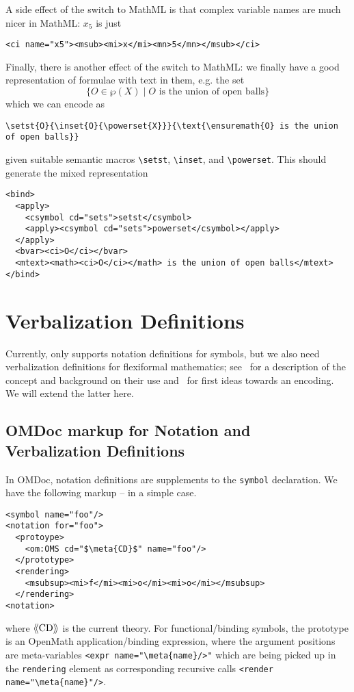 \documentclass{bluenote}
\def\omdoc{\textsf{OMDoc}\xspace}
\def\openmath{\textsf{OpenMath}\xspace}
\def\lstomdoc{\lstinline[language={[1.3]OMDoc},mathescape]}
\def\meta#1{\ensuremath{\langle\kern-.2em\langle\text{#1}\rangle\kern-.2em\rangle}}
\begin{document}
A side effect of the switch to MathML is that complex variable names are much nicer in
MathML: $x_5$ is just 
\begin{lstlisting}[language=MathML]
<ci name="x5"><msub><mi>x</mi><mn>5</mn></msub></ci>
\end{lstlisting}

Finally, there is another effect of the switch to MathML: we finally have a good
representation of formulae with text in them, e.g. the set 
\[\{O\in\wp(X)\mid O \text{ is the union of open balls}\}\]%
which we can encode as 
\begin{lstlisting}
\setst{O}{\inset{O}{\powerset{X}}}{\text{\ensuremath{O} is the union of open balls}}
\end{lstlisting}
given suitable semantic macros \lstinline|\setst|, \lstinline|\inset|, and
\lstinline|\powerset|. This should generate the mixed representation
\begin{lstlisting}[language=MathML]
<bind>
  <apply>
    <csymbol cd="sets">setst</csymbol>
    <apply><csymbol cd="sets">powerset</csymbol></apply>
  </apply>
  <bvar><ci>O</ci></bvar>
  <mtext><math><ci>O</ci></math> is the union of open balls</mtext>
</bind>
\end{lstlisting}

\section{Verbalization Definitions}

Currently, \sTeX only supports notation definitions for symbols, but we also need
verbalization definitions for flexiformal mathematics; see~\cite{Kohlhase:dmesmgm14} for a
description of the concept and background on their use and~\cite[section
5]{Kohlhase:dmsmglom14} for first ideas towards an \sTeX encoding. We will extend the
latter here.

\subsection{\omdoc markup for Notation and Verbalization Definitions}

In \omdoc, notation definitions are supplements to the \lstomdoc|symbol| declaration. We
have the following markup -- in a simple case. 

\begin{lstlisting}[language={[1.3]OMDoc},mathescape, 
  label=lst:nd-classical,caption=A classical Notation Definition]
<symbol name="foo"/>
<notation for="foo">
  <protoype>
    <om:OMS cd="$\meta{CD}$" name="foo"/>
  </prototype>
  <rendering>
    <msubsup><mi>f</mi><mi>o</mi><mi>o</mi></msubsup>
  </rendering>
<notation>
\end{lstlisting}
where \meta{CD} is the current theory. For functional/binding symbols, the prototype is an
\openmath application/binding expression, where the argument positions are meta-variables
\lstomdoc|<expr name="\meta{name}/>"| which are being picked up in the
\lstomdoc|rendering| element as corresponding recursive calls \lstomdoc|<render name="\meta{name}"/>|.
\end{document}
